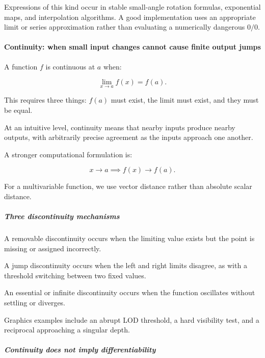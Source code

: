 Expressions of this kind occur in stable small-angle rotation formulas, exponential maps, and interpolation algorithms. A good implementation uses an appropriate limit or series approximation rather than evaluating a numerically dangerous \(0/0\).

\paragraph{Continuity: when small input changes cannot cause finite output jumps}\label{01-foundations-i-ch020-continuity-when-small-input-changes-cannot-cause-finite-output-jumps}

\hypertarget{01-foundations-i-ch020-continuity-when-small-input-changes-cannot-cause-finite-output-jumps}{}

A function \(f\) is continuous at \(a\) when:

\[
\lim_{x\to a}f(x)=f(a).
\]

This requires three things: \(f(a)\) must exist, the limit must exist, and they must be equal.

At an intuitive level, continuity means that nearby inputs produce nearby outputs, with arbitrarily precise agreement as the inputs approach one another.

A stronger computational formulation is:

\[
x\to a \implies f(x)\to f(a).
\]

For a multivariable function, we use vector distance rather than absolute scalar distance.

\subparagraph{Three discontinuity mechanisms}\label{01-foundations-i-ch020-three-discontinuity-mechanisms}

\hypertarget{01-foundations-i-ch020-three-discontinuity-mechanisms}{}

A removable discontinuity occurs when the limiting value exists but the point is missing or assigned incorrectly.

A jump discontinuity occurs when the left and right limits disagree, as with a threshold switching between two fixed values.

An essential or infinite discontinuity occurs when the function oscillates without settling or diverges.

Graphics examples include an abrupt LOD threshold, a hard visibility test, and a reciprocal approaching a singular depth.

\subparagraph{Continuity does not imply differentiability}\label{01-foundations-i-ch020-continuity-does-not-imply-differentiability}

